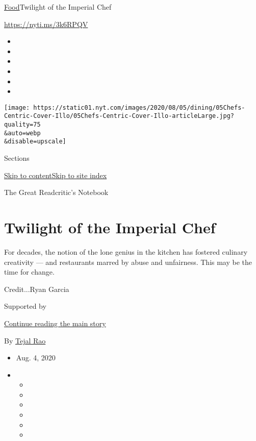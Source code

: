 \href{/section/food}{Food}\textbar{}Twilight of the Imperial Chef

\url{https://nyti.ms/3k6RPQV}

\begin{itemize}
\item
\item
\item
\item
\item
\item
\end{itemize}

\texttt{[image: https://static01.nyt.com/images/2020/08/05/dining/05Chefs-Centric-Cover-Illo/05Chefs-Centric-Cover-Illo-articleLarge.jpg?quality=75\\\&auto=webp\\\&disable=upscale]}

Sections

\protect\hyperlink{site-content}{Skip to
content}\protect\hyperlink{site-index}{Skip to site index}

The Great Readcritic's Notebook

\hypertarget{twilight-of-the-imperial-chef}{%
\section{Twilight of the Imperial
Chef}\label{twilight-of-the-imperial-chef}}

For decades, the notion of the lone genius in the kitchen has fostered
culinary creativity --- and restaurants marred by abuse and unfairness.
This may be the time for change.

Credit...Ryan Garcia

Supported by

\protect\hyperlink{after-sponsor}{Continue reading the main story}

By \href{https://www.nytimes.com/by/tejal-rao}{Tejal Rao}

\begin{itemize}
\item
  Aug. 4, 2020
\item
  \begin{itemize}
  \item
  \item
  \item
  \item
  \item
  \item
  \end{itemize}
\end{itemize}

